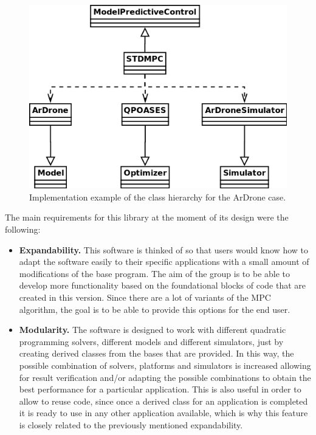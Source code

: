 \begin{figure}[H]
\centering
\includegraphics[scale=0.4]{Images/Chapter4/Class_diagram_implementation.png}
\caption{Implementation example of the class hierarchy for the ArDrone case.}
\label{fig:implementation_class_diagram}
\end{figure}

The main requirements for this library at the moment of its design were the following:

\begin{itemize}

\item \textbf{Expandability.} This software is thinked of so that users would know how to adapt the software easily to their specific applications with a small amount of modifications of the base program. The aim of the group is to be able to develop more functionality based on the foundational blocks of code that are created in this version. Since there are a lot of variants of the MPC algorithm, the goal is to be able to provide this options for the end user. 

\item \textbf{Modularity.} The software is designed to work with different quadratic programming solvers, different models and different simulators, just by creating derived classes from the bases that are provided. In this way, the possible combination of solvers, platforms and simulators is increased allowing for result verification and/or adapting the possible combinations to obtain the best performance for a particular application. This is also useful in order to allow to reuse code, since once a derived class for an application is completed it is ready to use in any other application available, which is why this feature is closely related to the previously mentioned expandability.

\end{itemize}

